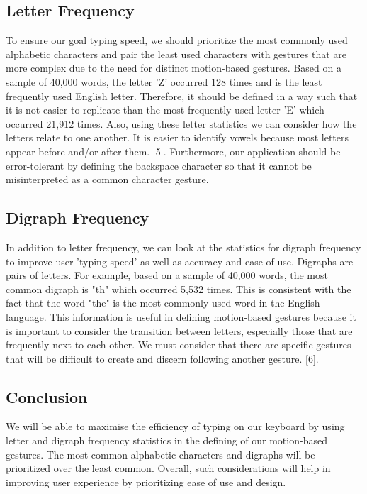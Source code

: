 \documentclass[onecolumn, draftclsnofoot,10pt, journal, letterpaper]{IEEEtran}
\begin{document}
\subsection{Letter Frequency}
To ensure our goal typing speed, we should prioritize the most commonly used alphabetic characters and pair the least used characters with gestures that are more complex due to the need for distinct motion-based gestures. Based on a sample of 40,000 words, the letter 'Z' occurred 128 times and is the least frequently used English letter. Therefore, it should be defined in a way such that it is not easier to replicate than the most frequently used letter 'E' which occurred 21,912 times. Also, using these letter statistics we can consider how the letters relate to one another. It is easier to identify vowels because most letters appear before and/or after them. [5]. Furthermore, our application should be error-tolerant by defining the backspace character so that it cannot be misinterpreted as a common character gesture.
\subsection{Digraph Frequency}
In addition to letter frequency, we can  look at the statistics for digraph frequency to improve user 'typing speed' as well as accuracy and ease of use. Digraphs are pairs of letters. For example, based on a sample of 40,000 words, the most common digraph is "th" which occurred 5,532 times. This is consistent with the fact that the word "the" is the most commonly used word in the English language. This information is useful in defining motion-based gestures because it is important to consider the transition between letters, especially those that are frequently next to each other. We must consider that there are specific gestures that will be difficult to create and discern following another gesture. [6].
\subsection{Conclusion}
 We will be able to maximise the efficiency of typing on our keyboard by using letter and digraph frequency statistics in the defining of our motion-based gestures. The most common alphabetic characters and digraphs will be prioritized over the least common. Overall, such considerations will help in improving user experience by prioritizing ease of use and design.

\pagebreak
\end{document}
